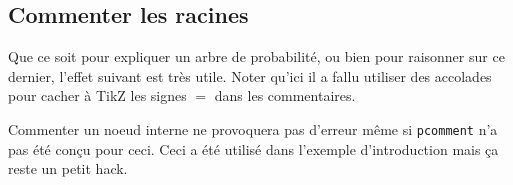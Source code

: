 \documentclass[12pt,a4paper]{article}
\begin{document}

\subsection{Commenter les racines}

Que ce soit pour expliquer un arbre de probabilité, ou bien pour raisonner sur ce dernier, l'effet suivant est très utile.
Noter qu'ici il a fallu utiliser des accolades pour cacher à TikZ les signes $=$ dans les commentaires.




\begin{remark}
	Commenter un noeud interne ne provoquera pas d'erreur même si \verb#pcomment# n'a pas été conçu pour ceci.
	Ceci a été utilisé dans l'exemple d'introduction mais ça reste un petit hack.
\end{remark}
\end{document}
